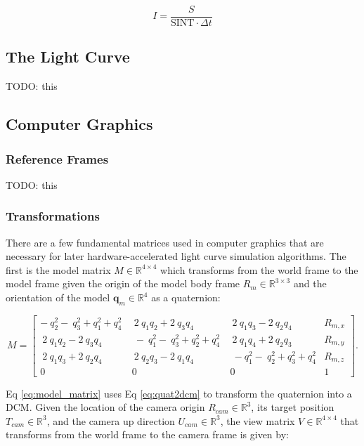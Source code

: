 \begin{equation} \label{eq:count_to_irrad}
  I = \frac{S}{\textrm{SINT} \cdot \Delta t}
\end{equation}

\subsection{The Light Curve}

TODO: this

\subsection{Computer Graphics}

\subsubsection{Reference Frames}

TODO: this

\subsubsection{Transformations}

There are a few fundamental matrices used in computer graphics that are necessary for later hardware-accelerated light curve simulation algorithms. The first is the model matrix $M \in \mathbb{R}^{4 \times 4}$ which transforms from the world frame to the model frame given the origin of the model body frame $R_{m} \in \mathbb{R}^{3 \times 3}$ and the orientation of the model $\mathbf{q}_m \in \mathbb{R}^4$ as a quaternion:

\begin{equation} \label{eq:model_matrix}
  M = \begin{bmatrix}
    -\ q_2^2-\ q_3^2+q_1^2+q_4^2\ &\ 2\ q_1q_2+2\ q_3q_4&\ 2\ q_1q_3-2\ q_2q_4 & R_{m,x}\\
    \ 2\ q_1q_2-2\ q_3q_4&\ -\ q_1^2-\ q_3^2+q_2^2+q_4^2\ &\ 2\ q_1q_4+2\ q_2q_3 & R_{m,y}\\
    \ 2\ q_1q_3+2\ q_2q_4&\ 2\ q_2q_3-2\ q_1q_4&\ -q_1^2-\ q_2^2+q_3^2+q_4^2 & R_{m,z} \\
    0 & 0 & 0 & 1
  \end{bmatrix}.
\end{equation}

Eq \ref{eq:model_matrix} uses Eq \ref{eq:quat2dcm} to transform the quaternion into a DCM. Given the location of the camera origin $R_{cam} \in \mathbb{R}^3$, its target position $T_{cam} \in \mathbb{R}^3$, and the camera up direction $U_{cam} \in \mathbb{R}^3$, the view matrix $V \in \mathbb{R}^{4 \times 4}$ that transforms from the world frame to the camera frame is given by:

